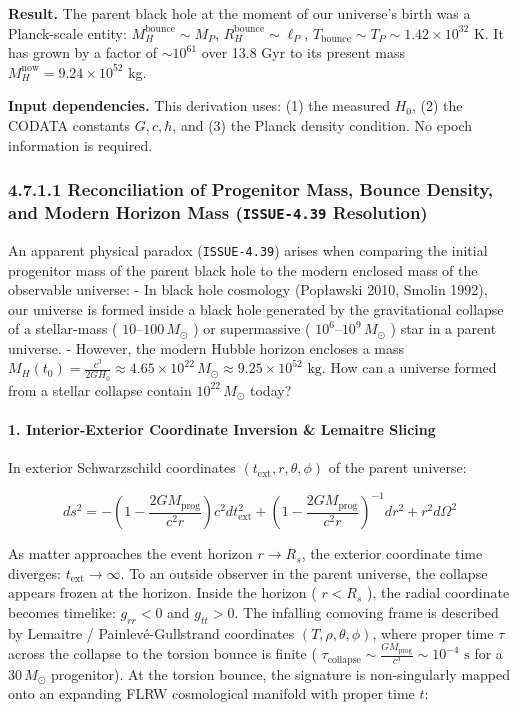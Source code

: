 \documentclass[11pt,a4paper]{article}
\theoremstyle{definition}\newtheorem{definition}{Definition}
\theoremstyle{remark}\newtheorem{remark}{Remark}
\begin{document}
\textbf{Result.} The parent black hole at the moment of our universe's birth was a Planck-scale entity: $M_H^{\text{bounce}} \sim M_P$, $R_H^{\text{bounce}} \sim \ell_P$, $T_{\text{bounce}} \sim T_P \sim 1.42 \times 10^{32}$ K. It has grown by a factor of $\sim 10^{61}$ over 13.8 Gyr to its present mass $M_H^{\text{now}} = 9.24 \times 10^{52}$ kg.

\textbf{Input dependencies.} This derivation uses: (1) the measured $H_0$, (2) the CODATA constants $G, c, \hbar$, and (3) the Planck density condition. No epoch information is required.
\subsubsection{4.7.1.1 Reconciliation of Progenitor Mass, Bounce Density, and Modern Horizon Mass (\texttt{ISSUE-4.39} Resolution)}

An apparent physical paradox (\texttt{ISSUE-4.39}) arises when comparing the initial progenitor mass of the parent black hole to the modern enclosed mass of the observable universe:
- In black hole cosmology (Popławski 2010, Smolin 1992), our universe is formed inside a black hole generated by the gravitational collapse of a stellar-mass ( $10\text{--}100 \, M_\odot$ ) or supermassive ( $10^6\text{--}10^9 \, M_\odot$ ) star in a parent universe.
- However, the modern Hubble horizon encloses a mass $M_H(t_0) = \frac{c^3}{2 G H_0} \approx 4.65 \times 10^{22} \, M_\odot \approx 9.25 \times 10^{52}\text{ kg}$.
How can a universe formed from a stellar collapse contain $10^{22} \, M_\odot$ today?
\paragraph{1. Interior-Exterior Coordinate Inversion \& Lemaitre Slicing}

In exterior Schwarzschild coordinates $(t_{\text{ext}}, r, \theta, \phi)$ of the parent universe:


\begin{equation}
ds^2 = -\left(1 - \frac{2GM_{\text{prog}}}{c^2 r}\right) c^2 dt_{\text{ext}}^2 + \left(1 - \frac{2GM_{\text{prog}}}{c^2 r}\right)^{-1} dr^2 + r^2 d\Omega^2
\end{equation}


As matter approaches the event horizon $r \to R_s$, the exterior coordinate time diverges: $t_{\text{ext}} \to \infty$. To an outside observer in the parent universe, the collapse appears frozen at the horizon.
Inside the horizon ( $r < R_s$ ), the radial coordinate becomes timelike: $g_{rr} < 0$ and $g_{tt} > 0$.
The infalling comoving frame is described by Lemaitre / Painlevé-Gullstrand coordinates $(T, \rho, \theta, \phi)$, where proper time $\tau$ across the collapse to the torsion bounce is finite ( $\tau_{\text{collapse}} \sim \frac{G M_{\text{prog}}}{c^3} \sim 10^{-4}\text{ s}$ for a $30 \, M_\odot$ progenitor).
At the torsion bounce, the signature is non-singularly mapped onto an expanding FLRW cosmological manifold with proper time $t$:
\end{document}
